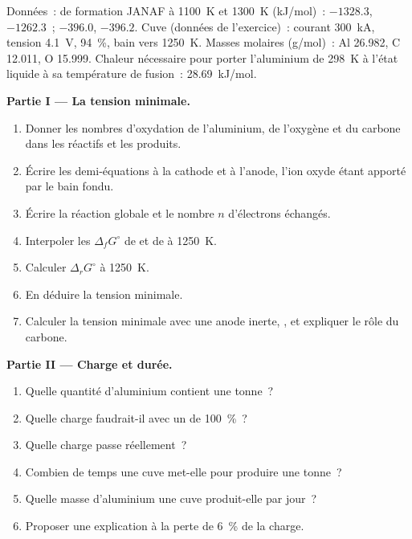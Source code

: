 \begin{problem}
\label{pb:b2:batteries-electrolysis:1}
Données~:  de formation JANAF à \qty{1100}{K} et \qty{1300}{K}
(\unit{kJ/mol})~:  $-1328.3$, $-1262.3$~;  $-396.0$, $-396.2$. Cuve
(données de l'exercice)~: courant \qty{300}{kA}, tension \qty{4.1}{V}, 
94~\%, bain vers \qty{1250}{K}. Masses molaires (\unit{g/mol})~: Al 26.982, C 12.011,
O 15.999. Chaleur nécessaire pour porter l'aluminium de \qty{298}{K} à l'état liquide à sa température de
fusion~: \qty{28.69}{kJ/mol}.

\medskip
\noindent\textbf{Partie I --- La tension minimale.}
\begin{enumerate}
  \item Donner les nombres d'oxydation de l'aluminium, de l'oxygène et du carbone dans les
        réactifs et les produits.
  \item Écrire les demi-équations à la cathode et à l'anode, l'ion oxyde
         étant apporté par le bain fondu.
  \item Écrire la réaction globale et le nombre $n$ d'électrons échangés.
  \item Interpoler les $\Delta_f G^\circ$ de  et de  à \qty{1250}{K}.
  \item Calculer $\Delta_r G^\circ$ à \qty{1250}{K}.
  \item En déduire la tension minimale.
  \item Calculer la tension minimale avec une anode inerte,
        , et expliquer le rôle du carbone.
\end{enumerate}

\medskip
\noindent\textbf{Partie II --- Charge et durée.}
\begin{enumerate}[resume]
  \item Quelle quantité d'aluminium contient une tonne~?
  \item Quelle charge faudrait-il avec un  de 100~\%~?
  \item Quelle charge passe réellement~?
  \item Combien de temps une cuve met-elle pour produire une tonne~?
  \item Quelle masse d'aluminium une cuve produit-elle par jour~?
  \item Proposer une explication à la perte de 6~\% de la charge.
\end{enumerate}


\end{problem}
